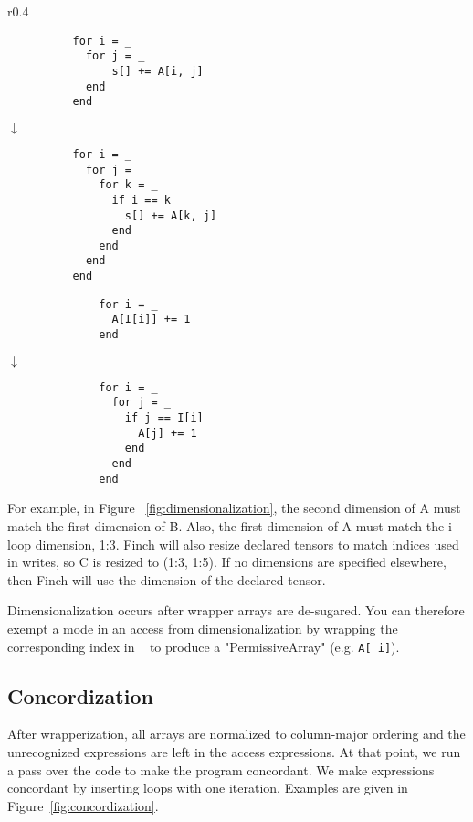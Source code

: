     
    \begin{wrapfigure}{r}{0.4\linewidth}
        \centering %
        \begin{minipage}{0.16\textwidth}
        \begin{verbatim}
          for i = _
            for j = _
                s[] += A[i, j]
            end
          end
        \end{verbatim}
        $\downarrow$
        \begin{verbatim}
          for i = _
            for j = _
              for k = _
                if i == k
                  s[] += A[k, j]
                end
              end
            end
          end
        \end{verbatim}
        \end{minipage}\hfill%
        \begin{minipage}{0.12\textwidth}
            \begin{verbatim}
              for i = _
                A[I[i]] += 1
              end
            \end{verbatim}
            $\downarrow$
            \begin{verbatim}
              for i = _
                for j = _
                  if j == I[i]
                    A[j] += 1
                  end
                end
              end
            \end{verbatim}
        \end{minipage}\hfill
        \caption{Examples of concordization, transforming accesses to column major with bare indices.}\label{fig:concordization}
    \end{wrapfigure}

    For example, in Figure ~\ref{fig:dimensionalization}, the second dimension of A must match the first dimension of B. Also, the first dimension of A must match the i loop dimension, 1:3. Finch will also resize declared tensors to match indices used in writes, so C is resized to (1:3, 1:5). If no dimensions are specified elsewhere, then Finch will use the dimension of the declared tensor.
    
    Dimensionalization occurs after wrapper arrays are de-sugared. You can
    therefore exempt a mode in an access from dimensionalization by wrapping the
    corresponding index in \texttt{~} to produce a "PermissiveArray" (e.g. \texttt{A[~i]}).

\subsection{Concordization}
    After wrapperization, all arrays are normalized to column-major ordering and
    the unrecognized expressions are left in the access expressions. At that
    point, we run a pass over the code to make the program concordant. We make
    expressions concordant by inserting loops with one iteration. Examples are given in Figure~\ref{fig:concordization}.

